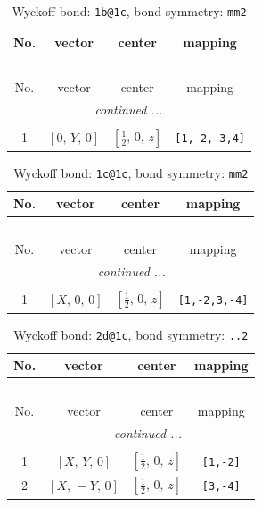\documentclass[fleqn,8pt]{jsarticle}
\begin{document}
\begin{longtable}{cccc}
\caption{Wyckoff bond: {\tt 1b@1c}, bond symmetry: {\tt mm2}}
 \\
 \hline \hline
No. & vector & center & mapping \\ \hline \endfirsthead

\multicolumn{3}{l}{\tablename\ \thetable{}} \\
 \hline \hline
No. & vector & center & mapping \\ \hline \endhead

 \hline \hline
\multicolumn{3}{r}{\footnotesize\it continued ...} \\ \endfoot

 \hline \hline
\multicolumn{3}{r}{} \\ \endlastfoot

1 & $\left[ 0,\, Y,\, 0 \right]$ & $\left[ \frac{1}{2},\, 0,\, z \right]$ & {\tt [1,-2,-3,4]} \\
\end{longtable}
\renewcommand{\arraystretch}{1.2}
\begin{longtable}{cccc}
\caption{Wyckoff bond: {\tt 1c@1c}, bond symmetry: {\tt mm2}}
 \\
 \hline \hline
No. & vector & center & mapping \\ \hline \endfirsthead

\multicolumn{3}{l}{\tablename\ \thetable{}} \\
 \hline \hline
No. & vector & center & mapping \\ \hline \endhead

 \hline \hline
\multicolumn{3}{r}{\footnotesize\it continued ...} \\ \endfoot

 \hline \hline
\multicolumn{3}{r}{} \\ \endlastfoot

1 & $\left[ X,\, 0,\, 0 \right]$ & $\left[ \frac{1}{2},\, 0,\, z \right]$ & {\tt [1,-2,3,-4]} \\
\end{longtable}
\renewcommand{\arraystretch}{1.2}
\begin{longtable}{cccc}
\caption{Wyckoff bond: {\tt 2d@1c}, bond symmetry: {\tt ..2}}
 \\
 \hline \hline
No. & vector & center & mapping \\ \hline \endfirsthead

\multicolumn{3}{l}{\tablename\ \thetable{}} \\
 \hline \hline
No. & vector & center & mapping \\ \hline \endhead

 \hline \hline
\multicolumn{3}{r}{\footnotesize\it continued ...} \\ \endfoot

 \hline \hline
\multicolumn{3}{r}{} \\ \endlastfoot

1 & $\left[ X,\, Y,\, 0 \right]$ & $\left[ \frac{1}{2},\, 0,\, z \right]$ & {\tt [1,-2]} \\ \hline
2 & $\left[ X,\, - Y,\, 0 \right]$ & $\left[ \frac{1}{2},\, 0,\, z \right]$ & {\tt [3,-4]} \\
\end{longtable}
\end{document}
